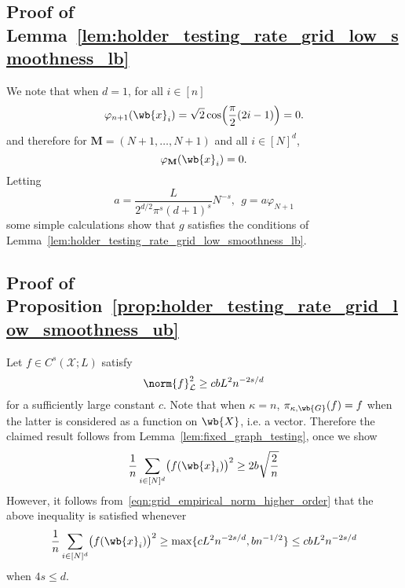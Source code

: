 \documentclass{article}
\newcommand{\1}{\mathbf{1}}
\newcommand{\Xset}{\mathcal{X}}
\newcommand{\Leb}{\mathcal{L}}
\theoremstyle{alden}
\theoremstyle{aldenthm}
\theoremstyle{definition}
\theoremstyle{remark}
\begin{document}
\subsection{Proof of Lemma~\ref{lem:holder_testing_rate_grid_low_smoothness_lb}}
We note that when $d = 1$, for all $i \in [n]$
\begin{equation*}
\varphi_{n + 1}(\wb{x}_i) = \sqrt{2}\cos\Bigl(\frac{\pi}{2}(2i - 1)\Bigr) = 0.
\end{equation*}
and therefore for $\mathbf{M} = (N + 1,\ldots,N + 1)$ and all $i \in [N]^d$,
\begin{equation*}
\varphi_{\mathbf{M}}(\wb{x}_i) = 0.
\end{equation*}
Letting 
\begin{equation*}
a = \frac{L}{2^{d/2}\pi^s(d+1)^s}N^{-s},~~ g = a \varphi_{N+1}
\end{equation*}
some simple calculations show that $g$ satisfies the conditions of Lemma~\ref{lem:holder_testing_rate_grid_low_smoothness_lb}.

\subsection{Proof of Proposition~\ref{prop:holder_testing_rate_grid_low_smoothness_ub}}
Let $f \in C^s(\Xset;L)$ satisfy
\begin{equation*}
\norm{f}_{\Leb}^2 \geq c b L^2 n^{-2s/d}
\end{equation*}
for a sufficiently large constant $c$. Note that when $\kappa = n$, $\pi_{\kappa,\wb{G}}(f) = f$ when the latter is considered as a function on $\wb{X}$, i.e. a vector. Therefore the claimed result follows from Lemma~\ref{lem:fixed_graph_testing}, once we show
\begin{equation*}
\frac{1}{n} \sum_{i \in [N]^d} \bigl(f(\wb{x}_i)\bigr)^2 \geq 2b \sqrt{\frac{2}{n}}
\end{equation*}
However, it follows from~\eqref{eqn:grid_empirical_norm_higher_order} that the above inequality is satisfied whenever
\begin{equation*}
\frac{1}{n} \sum_{i \in [N]^d} \bigl(f(\wb{x}_i)\bigr)^2 \geq \max\{c L^2 n^{-2s/d}, b n^{-1/2}\} \leq c b L^2 n^{-2s/d}
\end{equation*}
when $4s \leq d$.



\clearpage
\end{document}
